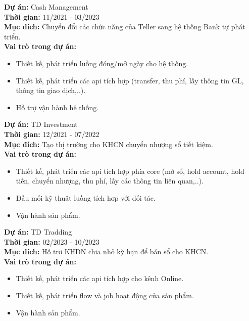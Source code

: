 \documentclass[11pt,a4paper,sans]{moderncv}
\begin{document}
\begin{mdframed}[style=ProjectFrame]
	\textbf{Dự án:} Cash Management \\
	\textbf{Thời gian:} 11/2021 - 03/2023 \\
	\textbf{Mục đích:} Chuyển đổi các chức năng của Teller sang hệ thống Bank tự phát triển.\\
	\textbf{Vai trò trong dự án:}
	\begin{itemize}[leftmargin=0.6cm,noitemsep,topsep=0pt,label=-]
	\item Thiết kế, phát triển luồng đóng/mở ngày cho hệ thống.
	\item Thiết kế, phát triển các api tích hợp (transfer, thu phí, lấy thông tin GL, thông tin giao dịch,..).
	\item Hỗ trợ vận hành hệ thống.
	\end{itemize}
\end{mdframed}

\begin{mdframed}[style=ProjectFrame]
	\textbf{Dự án:} TD Investment \\
	\textbf{Thời gian:} 12/2021 - 07/2022 \\
	\textbf{Mục đích:} Tạo thị trường cho KHCN chuyển nhượng sổ tiết kiệm.\\
	\textbf{Vai trò trong dự án:}
	\begin{itemize}[leftmargin=0.6cm,noitemsep,topsep=0pt,label=-]
		\item Thiết kế, phát triển các api tích hợp phía core (mở sổ, hold account, hold tiền, chuyển nhượng, thu phí, lấy các thông tin liên quan,..).
		\item Đầu mối kỹ thuât luồng tích hơp với đối tác.
		\item Vận hành sản phẩm.
	\end{itemize}
\end{mdframed}

\begin{mdframed}[style=ProjectFrame]
	\textbf{Dự án:} TD Tradding\\
	\textbf{Thời gian:} 02/2023 - 10/2023 \\
	\textbf{Mục đích:} Hỗ trơ KHDN chia nhỏ kỳ hạn để bán sổ cho KHCN.\\
	\textbf{Vai trò trong dự án:}
	\begin{itemize}[leftmargin=0.6cm,noitemsep,topsep=0pt,label=-]
		\item Thiết kế, phát triển các api tích hợp cho kênh Online.
		\item Thiết kế, phát triển flow và job hoạt động của sản phẩm.
		\item Vận hành sản phẩm.
	\end{itemize}
\end{mdframed}
\end{document}
